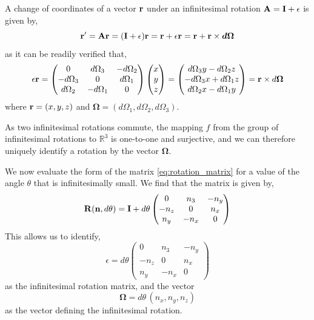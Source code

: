 \documentclass[12pt]{article}
\begin{document}
A change of coordinates of a vector $\vb{r}$ under an infinitesimal rotation
$\vb{A} = \vb{I} + \epsilon$ is given by,
\begin{equation}
  \vb{r}' = \vb{A}\vb{r} = (\vb{I} + \epsilon)\vb{r} = \vb{r} + \epsilon\vb{r}
           = \vb{r} + \vb{r} \times \boldsymbol{d\Omega}
\end{equation}
as it can be readily verified that,
\begin{equation}
  \epsilon\vb{r} =
  \begin{pmatrix}
    0           &  d\Omega_3 & -d\Omega_2 \\
    -d\Omega_3  &  0         &  d\Omega_1 \\
    d\Omega_2   & -d\Omega_1 &  0
  \end{pmatrix}
  \begin{pmatrix} x \\ y \\ z \end{pmatrix}
  =
  \begin{pmatrix}
    d\Omega_3 y - d\Omega_2 z \\
    -d\Omega_3 x + d\Omega_1 z \\
    d\Omega_2 x - d\Omega_1 y
  \end{pmatrix}
  = \vb{r} \times d\boldsymbol{\Omega}
\end{equation}
where $\vb{r} = (x,y,z)$ and $\boldsymbol{\Omega} = (d\Omega_1, d\Omega_2, d\Omega_3)$.

As two infinitesimal rotations commute, the mapping $f$ from the group of infinitesimal
rotations to $\mathbb{R}^3$ is one-to-one and surjective, and we can therefore uniquely
identify a rotation by the vector $\boldsymbol{\Omega}$.

We now evaluate the form of the matrix \eqref{eq:rotation_matrix} for a value of the angle
$\theta$ that is infinitesimally small. We find that the matrix is given by,
\begin{equation}
  \vb{R}(\vb{n}, d\theta) = \vb{I} + d\theta
  \begin{pmatrix}
    0     &  n_3  & -n_y \\
    -n_z  &  0    &  n_x \\
    n_y   & -n_x  &  0
  \end{pmatrix}
\end{equation}
This allows us to identify,
\begin{equation}
  \epsilon = d\theta
  \begin{pmatrix}
    0     &  n_3  & -n_y \\
    -n_z  &  0    &  n_x \\
    n_y   & -n_x  &  0
  \end{pmatrix}
\end{equation}
as the infinitesimal rotation matrix, and the vector
\begin{equation}
  \boldsymbol{\Omega} = d\theta\,(n_x, n_y, n_z)
\end{equation}
as the vector defining the infinitesimal rotation.
\end{document}
